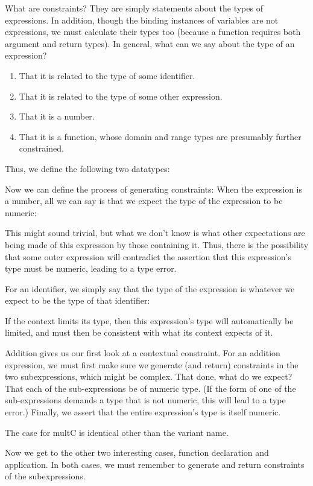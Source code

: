 What are constraints? They are simply statements about the types of expressions.
In addition, though the binding instances of variables are not expressions, we
must calculate their types too (because a function requires both argument and
return types). In general, what can we say about the type of an expression?
\begin{enumerate}[nosep]
  \item 
That it is related to the type of some identifier.
  \item 
That it is related to the type of some other expression.
  \item 
That it is a number.
  \item 
That it is a function, whose domain and range types are presumably further
constrained.
\end{enumerate}
Thus, we define the following two datatypes:

Now we can define the process of generating constraints:
When the expression is a number, all we can say is that we expect the type of
the expression to be numeric:

This might sound trivial, but what we don’t know is what other expectations are
being made of this expression by those containing it. Thus, there is the
possibility that some outer expression will contradict the assertion that this
expression’s type must be numeric, leading to a type error.

For an identifier, we simply say that the type of the expression is whatever we
expect to be the type of that identifier:

If the context limits its type, then this expression’s type will automatically
be limited, and must then be consistent with what its context expects of it.

Addition gives us our first look at a contextual constraint. For an addition
expression, we must first make sure we generate (and return) constraints in the
two subexpressions, which might be complex. That done, what do we expect? That
each of the sub-expressions be of numeric type. (If the form of one of the
sub-expressions demands a type that is not numeric, this will lead to a type
error.) Finally, we assert that the entire expression’s type is itself numeric.

The case for multC is identical other than the variant name.

Now we get to the other two interesting cases, function declaration and
application. In both cases, we must remember to generate and return constraints
of the subexpressions.

